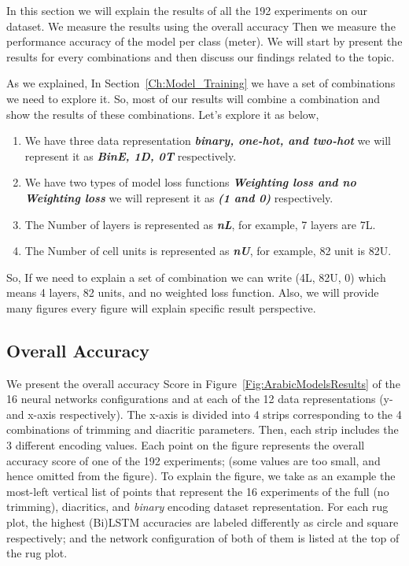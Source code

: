 In this section we will explain the results of all the 192 experiments on our dataset. We measure the results using the overall accuracy Then we measure the performance accuracy of the model per class (meter). We will start by present the results for every combinations and then discuss our findings related to the topic.

As we explained, In Section~\ref{Ch:Model_Training} we have a set of combinations we need to explore it. So, most of our results will combine a combination and show the results of these combinations. Let's explore it as below,
\begin{enumerate}
 \item We have three data representation \textbf{\textit{\textit{binary}, \textit{one-hot}, and \textit{two-hot}}} we will represent it as \textbf{\textit{BinE, 1D, 0T}} respectively.
 \item We have two types of model loss functions \textbf{\textit{Weighting loss and no Weighting loss}} we will represent it as \textbf{\textit{(1 and 0)}} respectively.
 \item The Number of layers is represented as \textbf{\textit{nL}}, for example, 7 layers are 7L.
 \item The Number of cell units is represented as \textbf{\textit{nU}}, for example, 82 unit is 82U.
\end{enumerate}

So, If we need to explain a set of combination we can write (4L, 82U, 0) which means 4 layers, 82 units, and no weighted loss function. Also, we will provide many figures every figure will explain specific result perspective.

\subsection{Overall Accuracy}

We present the overall accuracy Score in Figure~\ref{Fig:ArabicModelsResults} of the 16 neural networks configurations and at each of the 12 data representations (y- and x-axis respectively). The x-axis is divided into 4 strips corresponding to the 4 combinations of trimming and diacritic parameters. Then, each strip includes the 3 different encoding values. Each point on the figure represents the overall accuracy score of one of the 192 experiments; (some values are too small, and hence omitted from the figure). To explain the figure, we take as an example the most-left vertical list of points that represent the 16 experiments of the full (no trimming), diacritics, and \textit{binary} encoding dataset representation. For each rug plot, the highest (Bi)LSTM accuracies are labeled differently as circle and square respectively; and the network configuration of both of them is listed at the top of the rug plot.

